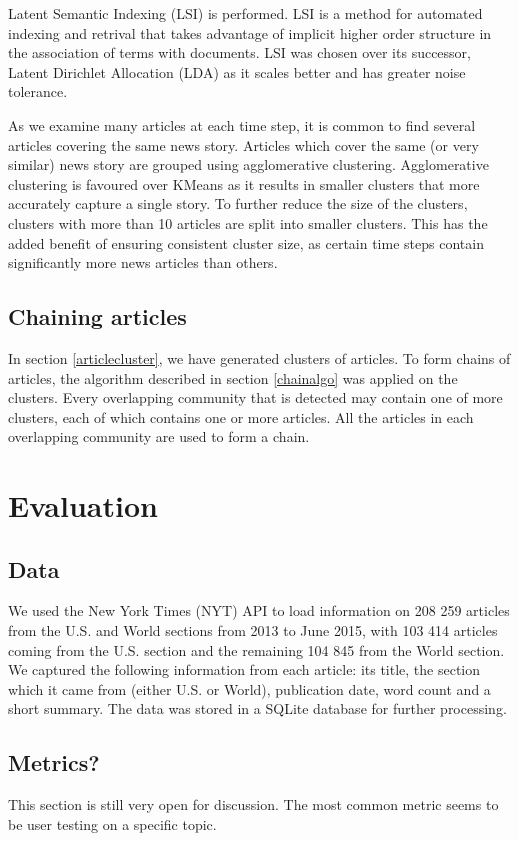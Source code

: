 \documentclass[12pt]{article}
\begin{document}
Latent Semantic Indexing (LSI) is performed. LSI is a method for automated indexing and retrival that takes advantage of implicit higher order structure in the association of terms with documents. LSI was chosen over its successor, Latent Dirichlet Allocation (LDA) as it scales better and has greater noise tolerance.

As we examine many articles at each time step, it is common to find several articles covering the same news story. Articles which cover the same (or very similar) news story are grouped using agglomerative clustering. Agglomerative clustering is favoured over KMeans as it results in smaller clusters that more accurately capture a single story. To further reduce the size of the clusters, clusters with more than 10 articles are split into smaller clusters. This has the added benefit of ensuring consistent cluster size, as certain time steps contain significantly more news articles than others.

\subsection{Chaining articles}
In section \ref{articlecluster}, we have generated clusters of articles. To form chains of articles, the algorithm described in section \ref{chainalgo} was applied on the clusters. Every overlapping community that is detected may contain one of more clusters, each of which contains one or more articles. All the articles in each overlapping community are used to form a chain.

\section{Evaluation}
\subsection{Data}
We used the New York Times (NYT) API to load information on 208 259 articles from the U.S. and World sections from 2013 to June 2015, with 103 414 articles coming from the U.S. section and the remaining 104 845 from the World section. We captured the following information from each article: its title, the section which it came from (either U.S. or World), publication date, word count and a short summary. The data was stored in a SQLite database for further processing.

\subsection{Metrics?}
This section is still very open for discussion. The most common metric seems to be user testing on a specific topic.
\end{document}
